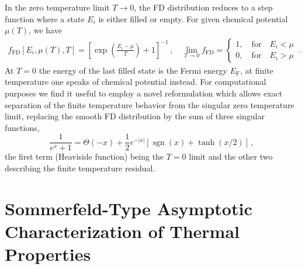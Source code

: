 \documentclass[sn-mathphys,Numbered]{sn-jnl}
\DeclareMathOperator{\sgn}{sgn}
\begin{document}
 In the zero temperature limit $T\to0$, the FD distribution reduces to a step function where a state $E_{i}$ is either filled or empty. For given chemical potential $\mu(T)$, we have
\begin{align}
\label{f_old}
f_\mathrm{FD}[E_{i},\mu(T),T]=\left[\exp\left(\frac{E_{i}-\mu}{T}\right)+1\right]^{-1}\,,\quad
\lim_{T\to0}f_\mathrm{FD}=\left\{
\begin{array}{c}
1,\quad\mathrm{for}\quad{E_{i}}<\mu\\
0,\quad\mathrm{for}\quad{E_{i}}>\mu
\end{array}
\right.\,.
\end{align}
At $T=0$ the energy of the last filled state is the Fermi energy $E_\mathrm{F}$, at finite temperature one speaks of chemical potential instead. For computational purposes we find it useful to employ a novel reformulation which allows exact separation of the finite temperature behavior from the singular zero temperature limit,  replacing the smooth FD distribution by the sum of three singular functions,
\begin{equation}
\frac{1}{e^{x} +1}=\Theta(-x)+\frac{1}{2}e^{-|x|}\left[\sgn(x)+\tanh(x/2)\right]\,,
\end{equation}
the first term (Heaviside function) being the $T=0$ limit and  the other two describing the finite temperature residual. 

\section{Sommerfeld-Type Asymptotic Characterization of Thermal Properties}\label{sec:Sommerfeld} 
\end{document}
